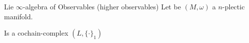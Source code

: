 \documentclass[handout,10pt]{beamer}
\begin{document}
\begin{frame}[fragile]{Lie $\infty$-algebra of Observables (higher observables) }
	Let be $(M,\omega)$ a $n$-plectic manifold.
	  	\vfill
	\begin{defblock}
		\medskip
		\hspace{.25em} Is a cochain-complex $(L,\{\cdot\}_1)$ \\
		\vspace{-1em}
		\begin{center}
			
		\end{center}
	\end{defblock}
  \end{frame}
\end{document}
